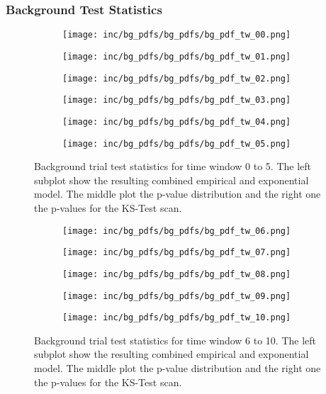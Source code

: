 \subsubsection{Background Test Statistics}
\begin{figure}[htbp]
  \centering
  \begin{subfigure}[c]{\textwidth}
    \texttt{[image: inc/bg\_pdfs/bg\_pdfs/bg\_pdf\_tw\_00.png]}
  \end{subfigure}
  \begin{subfigure}[c]{\textwidth}
    \texttt{[image: inc/bg\_pdfs/bg\_pdfs/bg\_pdf\_tw\_01.png]}
  \end{subfigure}
  \begin{subfigure}[c]{\textwidth}
    \texttt{[image: inc/bg\_pdfs/bg\_pdfs/bg\_pdf\_tw\_02.png]}
  \end{subfigure}
  \begin{subfigure}[c]{\textwidth}
    \texttt{[image: inc/bg\_pdfs/bg\_pdfs/bg\_pdf\_tw\_03.png]}
  \end{subfigure}
  \begin{subfigure}[c]{\textwidth}
    \texttt{[image: inc/bg\_pdfs/bg\_pdfs/bg\_pdf\_tw\_04.png]}
  \end{subfigure}
  \begin{subfigure}[c]{\textwidth}
    \texttt{[image: inc/bg\_pdfs/bg\_pdfs/bg\_pdf\_tw\_05.png]}
  \end{subfigure}
  \caption{Background trial test statistics for time window 0 to 5. The left subplot show the resulting combined empirical and exponential model. The middle plot the p-value distribution and the right one the p-values for the KS-Test scan.}
\end{figure}

\begin{figure}[htpb]
  \begin{subfigure}[c]{\textwidth}
    \texttt{[image: inc/bg\_pdfs/bg\_pdfs/bg\_pdf\_tw\_06.png]}
  \end{subfigure}
  \begin{subfigure}[c]{\textwidth}
    \texttt{[image: inc/bg\_pdfs/bg\_pdfs/bg\_pdf\_tw\_07.png]}
  \end{subfigure}
  \begin{subfigure}[c]{\textwidth}
    \texttt{[image: inc/bg\_pdfs/bg\_pdfs/bg\_pdf\_tw\_08.png]}
  \end{subfigure}
  \begin{subfigure}[c]{\textwidth}
    \texttt{[image: inc/bg\_pdfs/bg\_pdfs/bg\_pdf\_tw\_09.png]}
  \end{subfigure}
  \begin{subfigure}[c]{\textwidth}
    \texttt{[image: inc/bg\_pdfs/bg\_pdfs/bg\_pdf\_tw\_10.png]}
  \end{subfigure}
  \caption{Background trial test statistics for time window 6 to 10. The left subplot show the resulting combined empirical and exponential model. The middle plot the p-value distribution and the right one the p-values for the KS-Test scan.}
\end{figure}

